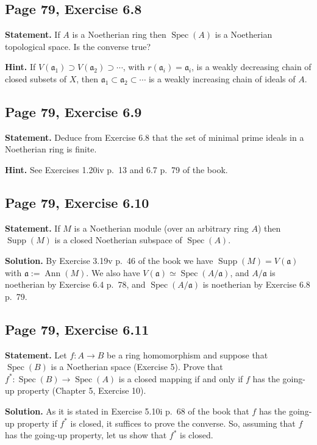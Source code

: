 \documentclass[parskip=half,fontsize=12pt]{scrartcl}%
\newcommand{\oo}{\operatorname}\newcommand{\ooo}{\operatorname*}
\newcommand{\mf}{\mathfrak}
\newcommand{\aaa}{\mf a}
\newcommand{\Spec}{\operatorname{Spec}}\newcommand{\Sp}{\operatorname{Spec}}
\begin{document}
\subsection{Page 79, Exercise 6.8}%

\textbf{Statement.} If $A$ is a Noetherian ring then $\Spec(A)$ is a Noetherian topological space. Is the converse true?

\textbf{Hint.} If $V(\aaa_1)\supset V(\aaa_2)\supset\cdots$, with $r(\aaa_i)=\aaa_i$, is a weakly decreasing chain of closed subsets of $X$, then $\aaa_1\subset\aaa_2\subset\cdots$ is a weakly increasing chain of ideals of $A$. 

\subsection{Page 79, Exercise 6.9}%

\textbf{Statement.} Deduce from Exercise 6.8 that the set of minimal prime ideals in a Noetherian ring is finite.

\textbf{Hint.} See Exercises 1.20iv p.~13 and 6.7 p.~79 of the book.

\subsection{Page 79, Exercise 6.10}%

\textbf{Statement.} If $M$ is a Noetherian module (over an arbitrary ring $A$) then $\oo{Supp}(M)$ is a closed Noetherian subspace of $\Spec(A)$.

\textbf{Solution.} By Exercise 3.19v p.~46 of the book we have $\oo{Supp}(M)=V(\aaa)$ with $\aaa:=\oo{Ann}(M)$. We also have $V(\aaa)\simeq\Spec(A/\aaa)$, and $A/\aaa$ is noetherian by Exercise 6.4 p.~78, and $\Spec(A/\aaa)$ is noetherian by Exercise 6.8 p.~79. 

\subsection{Page 79, Exercise 6.11}%

\textbf{Statement.} Let $f:A\to B$ be a ring homomorphism and suppose that $\Spec(B)$ is a Noetherian space (Exercise 5). Prove that $f^*:\Spec(B)\to\Spec(A)$ is a closed mapping if and only if $f$ has the going-up property (Chapter 5, Exercise 10).

\textbf{Solution.} As it is stated in Exercise 5.10i p.~68 of the book that $f$ has the going-up property if $f^*$ is closed, it suffices to prove the converse. So, assuming that $f$ has the going-up property, let us show that $f^*$ is closed. 
\end{document}
